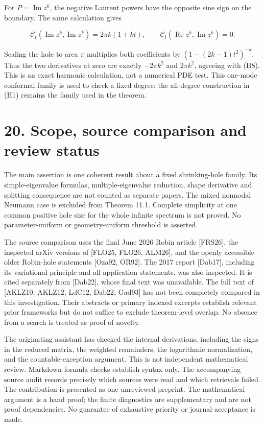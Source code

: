 \documentclass[11pt]{article}
\begin{document}
For \(P=\operatorname{Im}z^k\), the negative Laurent powers have the
opposite sine sign on the boundary. The same calculation gives

\[
 \mathcal C_t(\operatorname{Im}z^k,\operatorname{Im}z^k)
       =2\pi k(1+kt),\qquad
 \mathcal C_t(\operatorname{Re}z^k,\operatorname{Im}z^k)=0.
 \tag{H17}
\]

Scaling the hole to area \(\pi\) multiplies both coefficients by
\((1-(2k-1)t^2)^{-k}\). Thus the two derivatives at zero are exactly
\(-2\pi k^2\) and \(2\pi k^2\), agreeing with (H8). This is an exact
harmonic calculation, not a numerical PDE test. This one-mode conformal
family is used to check a fixed degree; the all-degree construction in
(H1) remains the family used in the theorem.

\section{20. Scope, source comparison and review
status}\label{scope-source-comparison-and-review-status}

The main assertion is one coherent result about a fixed shrinking-hole
family. Its simple-eigenvalue formulas, multiple-eigenvalue reduction,
shape derivative and splitting consequence are not counted as separate
papers. The mixed nonnodal Neumann case is excluded from Theorem 11.1.
Complete simplicity at one common positive hole size for the whole
infinite spectrum is not proved. No parameter-uniform or
geometry-uniform threshold is asserted.

The source comparison uses the final June 2026 Robin article
{[}FRS26{]}, the inspected arXiv versions of {[}FLO25, FLO26, ALM26{]},
and the openly accessible older Robin-hole statements {[}Oza92, OR92{]}.
The 2017 report {[}Dab17{]}, including its variational principle and all
application statements, was also inspected. It is cited separately from
{[}Dab22{]}, whose final text was unavailable. The full text of
{[}AKLZ10, AKLZ12, LdC12, Dab22, Gad93{]} has not been completely
compared in this investigation. Their abstracts or primary indexed
excerpts establish relevant prior frameworks but do not suffice to
exclude theorem-level overlap. No absence from a search is treated as
proof of novelty.

The originating assistant has checked the internal derivations,
including the signs in the reduced matrix, the weighted remainders, the
logarithmic normalization, and the countable-exception argument. This is
not independent mathematical review. Markdown formula checks establish
syntax only. The accompanying source audit records precisely which
sources were read and which retrievals failed. The contribution is
presented as one unreviewed preprint. The mathematical argument is a
hand proof; the finite diagnostics are supplementary and are not proof
dependencies. No guarantee of exhaustive priority or journal acceptance
is made.
\end{document}
